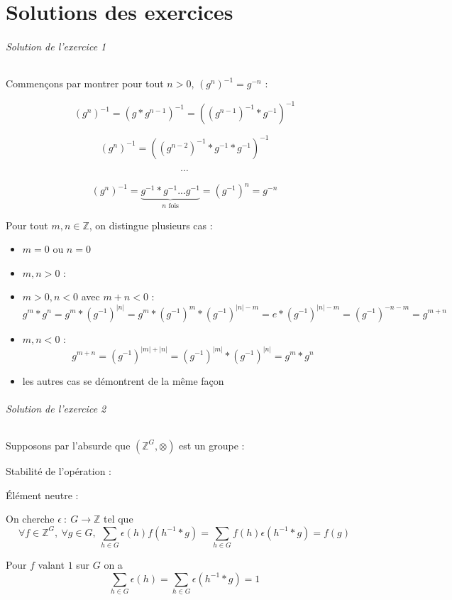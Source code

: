 \documentclass[]{article}
\theoremstyle{remark}
\theoremstyle{definition}
\newcommand{\funcshort}[3]{
#1 ~ : ~ #2 \longrightarrow #3
}
\begin{document}
\part{Solutions des exercices}

\paragraph{Solution de l'exercice 1}

Commençons par montrer pour tout $n > 0$, $( g^n )^{-1} = g^{-n}$ :

$$\left( g^n \right)^{-1} = (g * g^{n-1})^{-1} = ((g^{n-1})^{-1}*g^{-1})^{-1}$$

$$\left( g^n \right)^{-1} = ((g^{n-2})^{-1}*g^{-1}*g^{-1})^{-1}$$

$$\cdots$$

$$\left( g^n \right)^{-1} = \underbrace{g^{-1}*g^{-1} ... g^{-1}}_{n \text{ fois}} = (g^{-1})^n = g^{-n}$$

Pour tout $m, n \in \mathbb{Z}$, on distingue plusieurs cas :
\begin{itemize}
	\item $m = 0$ ou $n = 0$ \checkmark
	\item $m, n > 0$ : \checkmark
	\item $m > 0, n < 0$ avec $m + n < 0$ : $$g^m * g^n = g^m * \left(g^{-1}\right)^{|n|} = g^m*\left(g^{-1}\right)^m*\left(g^{-1}\right)^{|n| - m} = e * \left(g^{-1}\right)^{|n|-m}=\left(g^{-1}\right)^{-n-m}=g^{m+n}$$
	\item $m, n < 0$ : $$g^{m+n}=\left(g^{-1}\right)^{|m|+|n|}=\left(g^{-1}\right)^{|m|}*\left(g^{-1}\right)^{|n|}=g^m*g^n$$
	\item les autres cas se démontrent de la même façon
\end{itemize}

\paragraph{Solution de l'exercice 2}

Supposons par l'absurde que $\left(\mathbb{Z}^G, \otimes\right)$ est un groupe :

\subparagraph{Stabilité de l'opération :} \checkmark

\subparagraph{Élément neutre :} On cherche $\funcshort{\epsilon}{G}{\mathbb{Z}}$ tel que
$$\forall f \in \mathbb{Z}^G, ~ \forall g \in G, ~ \sum_{h \in G}\epsilon(h)f(h^{-1}*g)=\sum_{h \in G}f(h)\epsilon(h^{-1}*g)=f(g)$$

Pour $f$ valant $1$ sur $G$ on a
$$\sum_{h \in G}\epsilon(h)=\sum_{h \in G}\epsilon(h^{-1}*g)=1$$
\end{document}
